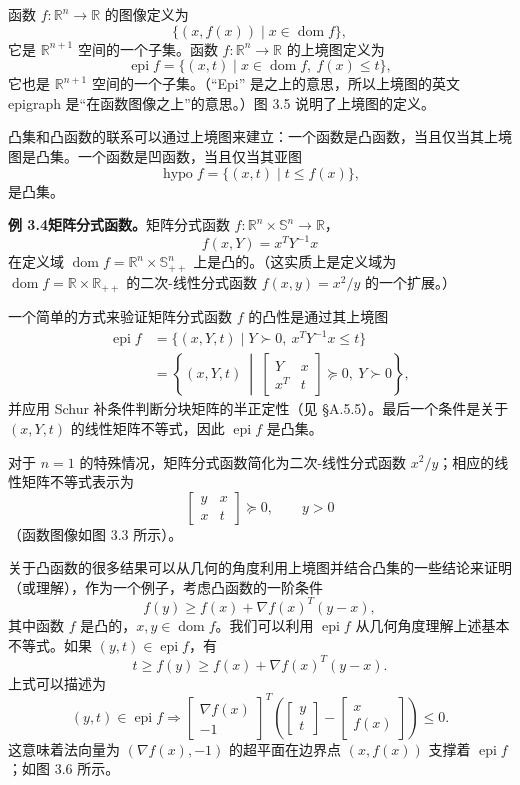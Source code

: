 \documentclass[UTF8,12pt,a4paper,fontset=fandol]{ctexart}
\DeclareMathOperator{\dom}{dom}
\DeclareMathOperator{\epi}{epi}
\DeclareMathOperator{\hypo}{hypo}
\begin{document}
函数 $f:\mathbb{R}^n\to\mathbb{R}$ 的图像定义为
\[
\{(x,f(x))\mid x\in\dom f\},
\]
它是 $\mathbb{R}^{n+1}$ 空间的一个子集。函数 $f:\mathbb{R}^n\to\mathbb{R}$ 的上境图定义为
\[
\epi f=\{(x,t)\mid x\in\dom f,\ f(x)\leq t\},
\]
它也是 $\mathbb{R}^{n+1}$ 空间的一个子集。（“Epi” 是之上的意思，所以上境图的英文 epigraph 是“在函数图像之上”的意思。）图 3.5 说明了上境图的定义。

凸集和凸函数的联系可以通过上境图来建立：一个函数是凸函数，当且仅当其上境图是凸集。一个函数是凹函数，当且仅当其亚图
\[
\hypo f=\{(x,t)\mid t\leq f(x)\},
\]
是凸集。

\noindent\textbf{例 3.4\quad 矩阵分式函数。}\quad 矩阵分式函数 $f:\mathbb{R}^n\times\mathbb{S}^n\to\mathbb{R}$，
\[
f(x,Y)=x^TY^{-1}x
\]
在定义域 $\dom f=\mathbb{R}^n\times\mathbb{S}_{++}^n$ 上是凸的。（这实质上是定义域为 $\dom f=\mathbb{R}\times\mathbb{R}_{++}$ 的二次-线性分式函数 $f(x,y)=x^2/y$ 的一个扩展。）

一个简单的方式来验证矩阵分式函数 $f$ 的凸性是通过其上境图
\[
\begin{aligned}
\epi f
&=\{(x,Y,t)\mid Y\succ0,\ x^TY^{-1}x\leq t\}\\
&=\left\{(x,Y,t)\ \middle|\ 
\begin{bmatrix}
Y & x\\
x^T & t
\end{bmatrix}\succeq0,\ Y\succ0
\right\},
\end{aligned}
\]
并应用 Schur 补条件判断分块矩阵的半正定性（见 \S A.5.5）。最后一个条件是关于 $(x,Y,t)$ 的线性矩阵不等式，因此 $\epi f$ 是凸集。

对于 $n=1$ 的特殊情况，矩阵分式函数简化为二次-线性分式函数 $x^2/y$；相应的线性矩阵不等式表示为
\[
\begin{bmatrix}
y & x\\
x & t
\end{bmatrix}\succeq0,\qquad y>0
\]
（函数图像如图 3.3 所示）。

关于凸函数的很多结果可以从几何的角度利用上境图并结合凸集的一些结论来证明（或理解），作为一个例子，考虑凸函数的一阶条件
\[
f(y)\geq f(x)+\nabla f(x)^T(y-x),
\]
其中函数 $f$ 是凸的，$x,y\in\dom f$。我们可以利用 $\epi f$ 从几何角度理解上述基本不等式。如果 $(y,t)\in\epi f$，有
\[
t\geq f(y)\geq f(x)+\nabla f(x)^T(y-x).
\]
上式可以描述为
\[
(y,t)\in\epi f\Longrightarrow
\begin{bmatrix}
\nabla f(x)\\
-1
\end{bmatrix}^T
\left(
\begin{bmatrix}
y\\
t
\end{bmatrix}
-
\begin{bmatrix}
x\\
f(x)
\end{bmatrix}
\right)\leq0.
\]
这意味着法向量为 $(\nabla f(x),-1)$ 的超平面在边界点 $(x,f(x))$ 支撑着 $\epi f$；如图 3.6 所示。
\end{document}
